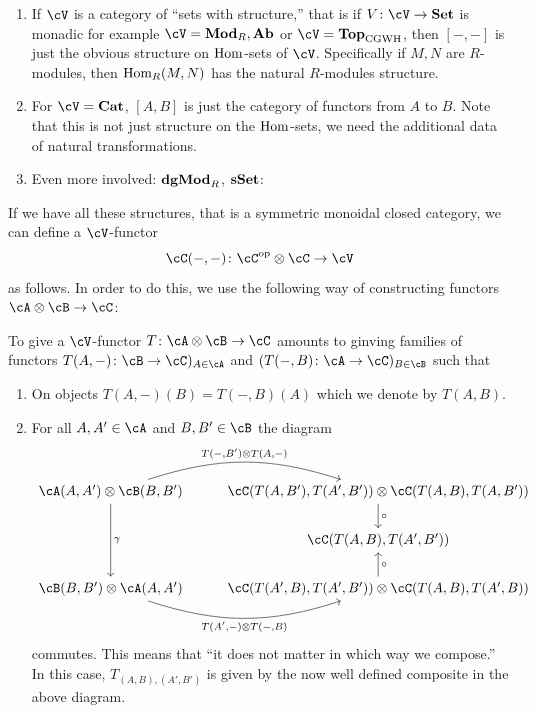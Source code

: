\documentclass[a4paper,11pt,oneside,openany]{scrbook}
\begin{document}
\begin{exmp}
	\begin{enumerate}[label=\arabic*)]
		\item
		      If $ \cV $ is a category of ``sets with structure,'' that is if $ V \from \cV \to \Set $ is monadic for example $ \cV = \Mod_R,\Ab $ or $ \cV = \Top_{\mathrm{CGWH}} $, then $ [-,-] $ is just the obvious structure on $ \operatorname{\text{Hom}} $-sets of $ \cV $.
		      Specifically if $ M,N $ are $ R $-modules, then $ \operatorname{\text{Hom}}_R(M,N) $ has the natural $ R $-modules structure.
		\item
		      For $ \cV = \Cat $, $ [A,B] $ is just the category of functors from $ A $ to $ B $. Note that this is not just structure on the $ \operatorname{\text{Hom}} $-sets, we need the additional data of natural transformations.
		\item Even more involved: $ {\normalfont\textbf{dgMod}}_R$, ${\normalfont\textbf{sSet}} $:
	\end{enumerate}
\end{exmp}
If we have all these structures, that is a symmetric monoidal closed category, we can define a $ \cV $-functor
\begin{displaymath}
	\cC(-,-) \from \cC^{\op}\otimes \cC \to \cV
\end{displaymath}
as follows.
In order to do this, we use the following way of constructing functors $ \cA\otimes \cB \to \cC $:
\begin{prop}
	To give a $ \cV $-functor $ T\from \cA \otimes \cB \to \cC $ amounts to ginving families of functors $ T(A,-)\from \cB \to \cC)_{A \in \cA} $ and $ (T(-,B) \from \cA \to \cC)_{B\in \cB} $ such that
	\begin{enumerate}[label=\roman*)]
		\item
		      On objects $ T(A,-)(B) = T(-,B)(A) $ which we denote by $ T(A,B) $.
		\item
		      For all $ A,A' \in \cA $ and $ B,B' \in \cB $ the diagram
		      \begin{displaymath}
			      \begin{tikzcd}%
				      \cA(A,A')\otimes \cB(B,B')
				      \arrow[r, "{T(-,B')\otimes T(A,-)}", bend left=18]
				      \arrow[dd, "\gamma"]
				      &
				      \cC(T(A,B') ,T(A',B')) \otimes \cC(T(A,B) ,T(A,B'))
				      \arrow[d, "\circ"]
				      \\
				      & \cC(T(A,B),T(A',B'))
				      \\
				      \cB(B,B') \otimes \cA(A,A')
				      \arrow[r, "{T(A',-)\otimes T(-,B)}"', bend right=18]
				      & \cC(T(A',B) ,T(A',B')) \otimes \cC(T(A,B) ,T(A',B))
				      \arrow[u, "\circ"']
			      \end{tikzcd}
		      \end{displaymath}
		      commutes.
		      This means that ``it does not matter in which way we compose.''
		      In this case, $ T_{(A,B),(A',B')}  $ is given by the now well defined composite in the above diagram.
	\end{enumerate}
\end{prop}
\end{document}
